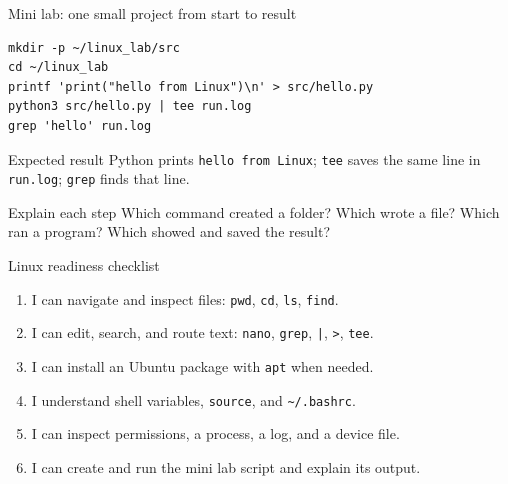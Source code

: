 \documentclass[aspectratio=169,10pt]{beamer}
\newcommand{\term}[1]{\texttt{#1}}
\begin{document}
\begin{frame}[fragile]{Mini lab: one small project from start to result}
  \begin{lstlisting}
mkdir -p ~/linux_lab/src
cd ~/linux_lab
printf 'print("hello from Linux")\n' > src/hello.py
python3 src/hello.py | tee run.log
grep 'hello' run.log
  \end{lstlisting}
  \begin{block}{Expected result}
    Python prints \term{hello from Linux}; \term{tee} saves the same line in \term{run.log}; \term{grep} finds that line.
  \end{block}
  \begin{exampleblock}{Explain each step}
    Which command created a folder? Which wrote a file? Which ran a program? Which showed and saved the result?
  \end{exampleblock}
\end{frame}

\begin{frame}{Linux readiness checklist}
  \begin{enumerate}
    \item I can navigate and inspect files: \term{pwd}, \term{cd}, \term{ls}, \term{find}.
    \item I can edit, search, and route text: \term{nano}, \term{grep}, \term{|}, \term{>}, \term{tee}.
    \item I can install an Ubuntu package with \term{apt} when needed.
    \item I understand shell variables, \term{source}, and \term{\textasciitilde{}/.bashrc}.
    \item I can inspect permissions, a process, a log, and a device file.
    \item I can create and run the mini lab script and explain its output.
  \end{enumerate}
\end{frame}
\end{document}
